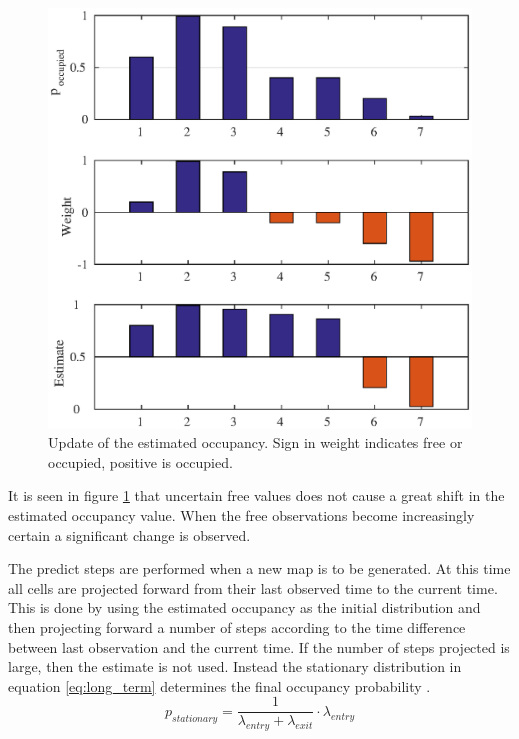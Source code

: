 \begin{figure}[htbp]
	\centering
	\includegraphics[width=1\linewidth]{chapters/cost_interpretation/figures/update}
	\caption{Update of the estimated occupancy. Sign in weight indicates free or occupied, positive is occupied. }
	\label{fig:cost_update}
\end{figure}

It is seen in figure \ref{fig:cost_update} that uncertain free values does not cause a great shift in the estimated occupancy value. When the free observations become increasingly certain a significant change is observed. 

The predict steps are performed when a new map is to be generated. At this time all cells are projected forward from their last observed time to the current time. This is done by using the estimated occupancy as the initial distribution and then projecting forward a number of steps according to the time difference between last observation and the current time. If the number of steps projected is large, then the estimate is not used. Instead the stationary distribution in  equation \ref{eq:long_term}  determines the final occupancy probability \cite{Meyer-Delius2012}.
\begin{equation}
	\label{eq:long_term}
	p_{stationary} = \frac{1}{\lambda_{entry} + \lambda_{exit}} \cdot \lambda_{entry}
\end{equation}

